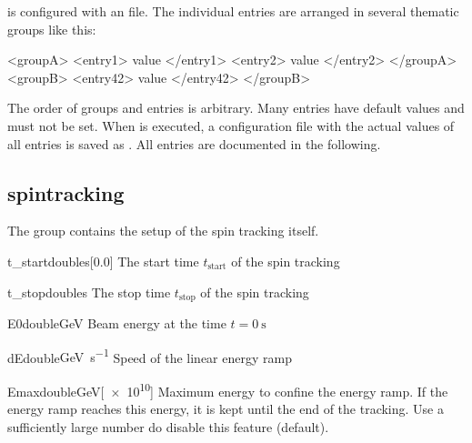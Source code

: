\documentclass[a4paper]{scrartcl}
\begin{document}
\polem is configured with an \xml file. The individual entries are arranged in several
thematic groups like this:
\begin{xmlcode}
  <groupA>
    <entry1> value </entry1>
    <entry2> value </entry2>
  </groupA>
  <groupB>
    <entry42> value </entry42>
  </groupB>
\end{xmlcode}
The order of groups and entries is arbitrary. Many entries have default values and must
not be set. When \polem is executed, a configuration file with the actual values of all
entries is saved as . All entries are
documented in the following.

\subsection{spintracking}
\label{sec:config-spintrk}

The group  contains the setup of the spin tracking itself.\\[2mm]

\begin{configdoc}{t_start}{double}{\si{\s}}[0.0]
  The start time $t_\text{start}$ of the spin tracking
\end{configdoc}

\begin{configdoc}{t_stop}{double}{\si{\s}}
  The stop time $t_\text{stop}$ of the spin tracking
\end{configdoc}

\begin{configdoc}{E0}{double}{\si{\GeV}}
  Beam energy at the time $t=\SI{0}{\s}$
\end{configdoc}

\begin{configdoc}{dE}{double}{\si{\GeV\per\s}}
  Speed of the linear energy ramp
\end{configdoc}

\begin{configdoc}{Emax}{double}{\si{\GeV}}[\num{e10}]
  Maximum energy to confine the energy ramp.
  If the energy ramp reaches this energy, it is kept until the end of the tracking. Use a
  sufficiently large number do disable this feature (default).
\end{configdoc}
\end{document}
